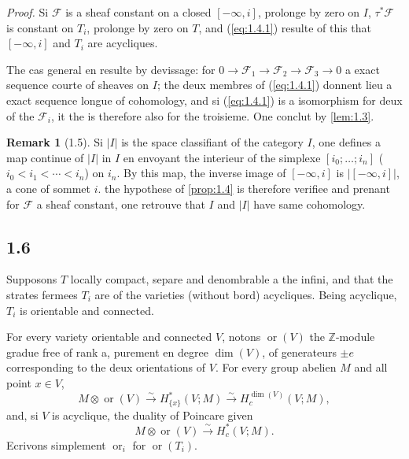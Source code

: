 \documentclass[11pt,a4paper]{article}
\theoremstyle{plain}
\theoremstyle{definition}
\newtheorem{remark}[theorem]{Remark}
\newcommand{\ori}{\operatorname{or}}
\begin{document}
\noindent\textit{Proof.} Si $\mathcal{F}$ is a sheaf constant on a closed $[-\infty,i]$, prolonge by zero on $I$, $\tau^*\mathcal{F}$ is constant on $T_i$, prolonge by zero on $T$, and (\ref{eq:1.4.1}) resulte of this that $[-\infty,i]$ and $T_i$ are acycliques.

The cas general en resulte by devissage: for $0 \to \mathcal{F}_1 \to \mathcal{F}_2 \to \mathcal{F}_3 \to 0$ a exact sequence courte of sheaves on $I$; the deux membres of (\ref{eq:1.4.1}) donnent lieu a exact sequence longue of cohomology, and si (\ref{eq:1.4.1}) is a isomorphism for deux of the $\mathcal{F}_i$, it the is therefore also for the troisieme. One conclut by \ref{lem:1.3}.

\begin{remark}[1.5]\label{rem:1.5}
Si $|I|$ is the space classifiant of the category $I$, one defines a map continue of $|I|$ in $I$ en envoyant the interieur of the simplexe $[i_0;\ldots;i_n]$ ($i_0 < i_1 < \cdots < i_n$) on $i_n$. By this map, the inverse image of $[-\infty,i]$ is $|[{-\infty},i]|$, a cone of sommet $i$. the hypothese of \ref{prop:1.4} is therefore verifiee and prenant for $\mathcal{F}$ a sheaf constant, one retrouve that $I$ and $|I|$ have same cohomology.
\end{remark}

\subsection{1.6}\label{subsec:1.6}

Supposons $T$ locally compact, separe and denombrable a the infini, and that the strates fermees $T_i$ are of the varieties (without bord) acycliques. Being acyclique, $T_i$ is orientable and connected.

For every variety orientable and connected $V$, notons $\ori(V)$ the $\mathbb{Z}$-module gradue free of rank a, purement en degree $\dim(V)$, of generateurs $\pm e$ corresponding to the deux orientations of $V$. For every group abelien $M$ and all point $x \in V$,
\begin{equation}\label{eq:1.6.1}
M \otimes \ori(V) \xrightarrow{\sim} H^*_{\{x\}}(V;M) \xrightarrow{\sim} H^{\dim(V)}_c(V;M),
\tag{1.6.1}
\end{equation}
and, si $V$ is acyclique, the duality of Poincare given
\begin{equation}\label{eq:1.6.2}
M \otimes \ori(V) \xrightarrow{\sim} H^*_c(V;M).
\tag{1.6.2}
\end{equation}
Ecrivons simplement $\ori_i$ for $\ori(T_i)$.
\end{document}
